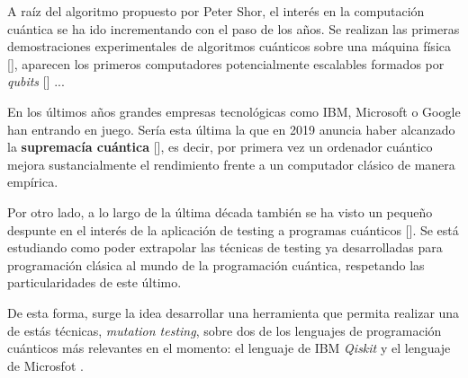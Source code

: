 A raíz del algoritmo propuesto por Peter Shor, el interés en la computación cuántica se ha ido incrementando con el paso de los años. Se realizan las primeras demostraciones experimentales de algoritmos cuánticos sobre una máquina física [\cite{jones1998implementation}], aparecen los primeros computadores potencialmente escalables formados por \textit{qubits} [\cite{haffner2005scalable}] ... 

En los últimos años grandes empresas tecnológicas como IBM, Microsoft o Google han entrando en juego.
Sería esta última la que en 2019 anuncia haber alcanzado la \textbf{supremacía cuántica} [\cite{arute2019quantum}], es decir, por primera vez un ordenador cuántico mejora sustancialmente el rendimiento frente a un computador clásico de manera empírica.

Por otro lado, a lo largo de la última década también se ha visto un pequeño despunte en el interés de la aplicación de testing a programas cuánticos [\cite{usaolaquantum}]. Se está estudiando como poder extrapolar las técnicas de testing ya desarrolladas para programación clásica al mundo de la programación cuántica, respetando las particularidades de este último.

De esta forma, surge la idea desarrollar una herramienta que permita realizar una de estás técnicas, \textit{mutation testing}, sobre dos de los lenguajes de programación cuánticos más relevantes en el momento: el lenguaje de IBM \textit{Qiskit} y el lenguaje de Microsfot \textit{\qsh}.

